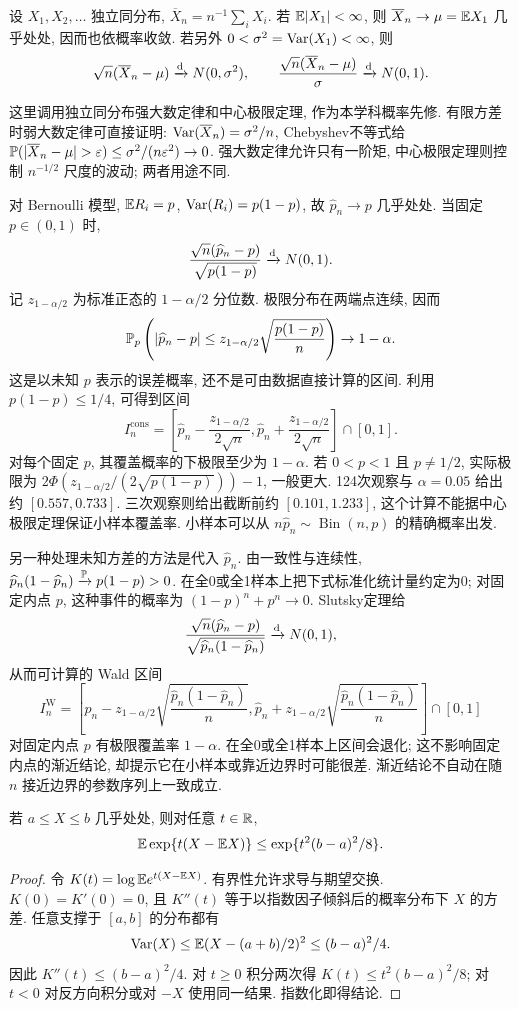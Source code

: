 \begin{theorem}[独立同分布的概率先修]
设 $X_1,X_2,\ldots$ 独立同分布, $\overline X_n=n^{-1}\sum_iX_i$. 若 $\mathbb E|X_1|<\infty$, 则 $\overline X_n\to\mu=\mathbb E X_1$ 几乎处处, 因而也依概率收敛. 若另外 $0<\sigma^2=\operatorname{Var}(X_1)<\infty$, 则
\[
 \sqrt n(\overline X_n-\mu)\xrightarrow{\mathrm d} N(0,\sigma^2),\qquad
 \frac{\sqrt n(\overline X_n-\mu)}{\sigma}\xrightarrow{\mathrm d} N(0,1).
\]
\end{theorem}
这里调用独立同分布强大数定律和中心极限定理, 作为本学科概率先修. 有限方差时弱大数定律可直接证明: $\operatorname{Var}(\overline X_n)=\sigma^2/n$, Chebyshev不等式给 $\PP(|\overline X_n-\mu|>\varepsilon)\le\sigma^2/(n\varepsilon^2)\to0$. 强大数定律允许只有一阶矩, 中心极限定理则控制 $n^{-1/2}$ 尺度的波动; 两者用途不同.

对 Bernoulli 模型, $\mathbb E R_i=p$, $\operatorname{Var}(R_i)=p(1-p)$, 故 $\widehat p_n\to p$ 几乎处处. 当固定 $p\in(0,1)$ 时,
\[
 \frac{\sqrt n(\widehat p_n-p)}{\sqrt{p(1-p)}}\xrightarrow{\mathrm d} N(0,1).
\]
记 $z_{1-\alpha/2}$ 为标准正态的 $1-\alpha/2$ 分位数. 极限分布在两端点连续, 因而
\[
 \mathbb P_p\left(|\widehat p_n-p|\le z_{1-\alpha/2}\sqrt{\frac{p(1-p)}n}\right)\to1-\alpha.
\]
这是以未知 $p$ 表示的误差概率, 还不是可由数据直接计算的区间. 利用 $p(1-p)\le1/4$, 可得到区间
\[
 I_n^{\mathrm{cons}}=
 \left[\widehat p_n-\frac{z_{1-\alpha/2}}{2\sqrt n},
       \widehat p_n+\frac{z_{1-\alpha/2}}{2\sqrt n}\right]\cap[0,1].
\]
对每个固定 $p$, 其覆盖概率的下极限至少为 $1-\alpha$. 若 $0<p<1$ 且 $p\ne1/2$, 实际极限为 $2\Phi(z_{1-\alpha/2}/(2\sqrt{p(1-p)}))-1$, 一般更大. 124次观察与 $\alpha=0.05$ 给出约 $[0.557,0.733]$. 三次观察则给出截断前约 $[0.101,1.233]$, 这个计算不能据中心极限定理保证小样本覆盖率. 小样本可以从 $n\widehat p_n\sim\operatorname{Bin}(n,p)$ 的精确概率出发.

另一种处理未知方差的方法是代入 $\widehat p_n$. 由一致性与连续性, $\widehat p_n(1-\widehat p_n)\xrightarrow{\mathbb P} p(1-p)>0$. 在全0或全1样本上把下式标准化统计量约定为0; 对固定内点 $p$, 这种事件的概率为 $(1-p)^n+p^n\to0$. Slutsky定理给
\[
 \frac{\sqrt n(\widehat p_n-p)}{\sqrt{\widehat p_n(1-\widehat p_n)}}\xrightarrow{\mathrm d} N(0,1),
\]
从而可计算的 Wald 区间
\[
 I_n^{\mathrm W}=\left[
 \widehat p_n-z_{1-\alpha/2}\sqrt{\frac{\widehat p_n(1-\widehat p_n)}n},
 \widehat p_n+z_{1-\alpha/2}\sqrt{\frac{\widehat p_n(1-\widehat p_n)}n}
 \right]\cap[0,1]
\]
对固定内点 $p$ 有极限覆盖率 $1-\alpha$. 在全0或全1样本上区间会退化; 这不影响固定内点的渐近结论, 却提示它在小样本或靠近边界时可能很差. 渐近结论不自动在随 $n$ 接近边界的参数序列上一致成立.

\begin{lemma}[Hoeffding引理]
若 $a\le X\le b$ 几乎处处, 则对任意 $t\in\mathbb R$,
\[
 \mathbb E\exp\{t(X-\mathbb E X)\}\le\exp\{t^2(b-a)^2/8\}.
\]
\end{lemma}
\begin{proof}
令 $K(t)=\log\mathbb E e^{t(X-\mathbb E X)}$. 有界性允许求导与期望交换. $K(0)=K'(0)=0$, 且 $K''(t)$ 等于以指数因子倾斜后的概率分布下 $X$ 的方差. 任意支撑于 $[a,b]$ 的分布都有
\[
 \operatorname{Var}(X)\le\mathbb E(X-(a+b)/2)^2\le(b-a)^2/4.
\]
因此 $K''(t)\le(b-a)^2/4$. 对 $t\ge0$ 积分两次得 $K(t)\le t^2(b-a)^2/8$; 对 $t<0$ 对反方向积分或对 $-X$ 使用同一结果. 指数化即得结论.
\end{proof}

